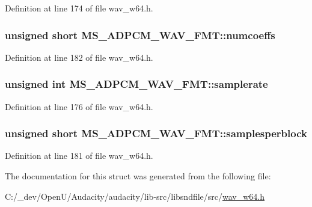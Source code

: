 Definition at line 174 of file wav\+\_\+w64.\+h.

\subsubsection[{\texorpdfstring{numcoeffs}{numcoeffs}}]{\setlength{\rightskip}{0pt plus 5cm}unsigned short M\+S\+\_\+\+A\+D\+P\+C\+M\+\_\+\+W\+A\+V\+\_\+\+F\+M\+T\+::numcoeffs}\hypertarget{struct_m_s___a_d_p_c_m___w_a_v___f_m_t_abc4760b03c012bd5c4d0091e192a9cdd}{}\label{struct_m_s___a_d_p_c_m___w_a_v___f_m_t_abc4760b03c012bd5c4d0091e192a9cdd}


Definition at line 182 of file wav\+\_\+w64.\+h.

\subsubsection[{\texorpdfstring{samplerate}{samplerate}}]{\setlength{\rightskip}{0pt plus 5cm}unsigned {\bf int} M\+S\+\_\+\+A\+D\+P\+C\+M\+\_\+\+W\+A\+V\+\_\+\+F\+M\+T\+::samplerate}\hypertarget{struct_m_s___a_d_p_c_m___w_a_v___f_m_t_af01bf395827355625f406b8f309710ce}{}\label{struct_m_s___a_d_p_c_m___w_a_v___f_m_t_af01bf395827355625f406b8f309710ce}


Definition at line 176 of file wav\+\_\+w64.\+h.

\subsubsection[{\texorpdfstring{samplesperblock}{samplesperblock}}]{\setlength{\rightskip}{0pt plus 5cm}unsigned short M\+S\+\_\+\+A\+D\+P\+C\+M\+\_\+\+W\+A\+V\+\_\+\+F\+M\+T\+::samplesperblock}\hypertarget{struct_m_s___a_d_p_c_m___w_a_v___f_m_t_a1a040efd063343056872073639ebb77c}{}\label{struct_m_s___a_d_p_c_m___w_a_v___f_m_t_a1a040efd063343056872073639ebb77c}


Definition at line 181 of file wav\+\_\+w64.\+h.



The documentation for this struct was generated from the following file\+:\begin{DoxyCompactItemize}
\item 
C\+:/\+\_\+dev/\+Open\+U/\+Audacity/audacity/lib-\/src/libsndfile/src/\hyperlink{wav__w64_8h}{wav\+\_\+w64.\+h}\end{DoxyCompactItemize}
